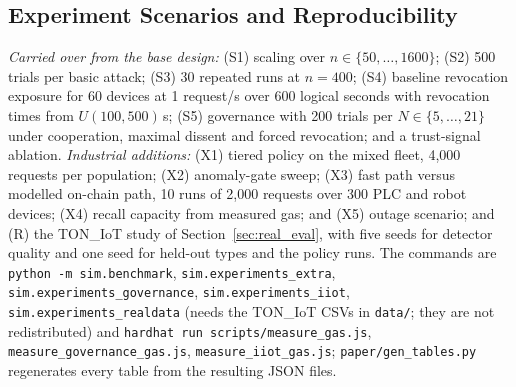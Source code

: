 \subsection{Experiment Scenarios and Reproducibility}\label{sec:scenarios}
\emph{Carried over from the base design:} (S1) scaling over $n\in\{50,\dots,1600\}$; (S2) 500 trials per basic attack; (S3) 30 repeated runs at $n=400$; (S4) baseline revocation exposure for 60 devices at 1 request/s over 600 logical seconds with revocation times from $U(100,500)$\,s; (S5) governance with 200 trials per $N\in\{5,\dots,21\}$ under cooperation, maximal dissent and forced revocation; and a trust-signal ablation. \emph{Industrial additions:} (X1) tiered policy on the mixed fleet, 4{,}000 requests per population; (X2) anomaly-gate sweep; (X3) fast path versus modelled on-chain path, 10 runs of 2{,}000 requests over 300 PLC and robot devices; (X4) recall capacity from measured gas; and (X5) outage scenario; and (R) the TON\_IoT study of Section~\ref{sec:real_eval}, with five seeds for detector quality and one seed for held-out types and the policy runs. The commands are \texttt{python -m sim.benchmark}, \texttt{sim.experiments\_extra}, \texttt{sim.experiments\_governance}, \texttt{sim.experiments\_iiot}, \texttt{sim.experiments\_realdata} (needs the TON\_IoT CSVs in \texttt{data/}; they are not redistributed) and \texttt{hardhat run scripts/measure\_gas.js}, \texttt{measure\_governance\_gas.js}, \texttt{measure\_iiot\_gas.js}; \texttt{paper/gen\_tables.py} regenerates every table from the resulting JSON files.

